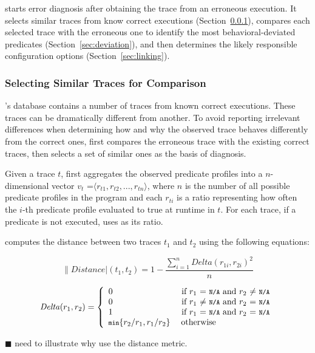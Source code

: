 \ourtool starts error diagnosis after obtaining the trace from
an erroneous execution. It selects similar
traces from know correct executions (Section~\ref{sec:similar}), compares
each selected trace with
the erroneous one to identify the most behavioral-deviated predicates
(Section~\ref{sec:deviation}), and then determines
the likely responsible configuration options (Section~\ref{sec:linking}).


\subsubsection{Selecting Similar Traces for Comparison}
\label{sec:similar}

\ourtool's database contains a number of
traces from known correct executions.  These traces
can be dramatically different from another.  To avoid reporting irrelevant
differences when 
determining how and why the observed trace behaves
differently from the correct ones, \ourtool first
compares the erroneous trace with the existing
correct traces, then selects a set of similar ones
as the basis of diagnosis.

Given a trace $t$, \ourtool first aggregates
the observed predicate profiles into a $n$-dimensional
vector $v_{t}$ =$\langle r_{t1}, r_{t2}, ..., r_{tn}\rangle$, where $n$
is the number of all possible predicate profiles in the program
and each $r_{ti}$ is a ratio representing how often the $i$-th predicate
profile evaluated
to true at runtime in $t$. For each trace, if a predicate is not executed,
\ourtool uses  as its ratio.


\ourtool computes the distance between two traces $t_1$ and $t_2$ using
the following equations:

\[
\|Distance|(t_1, t_2) = 1 - \frac{\sum_{i = 1}^{n}Delta(r_{1i}, r_{2i})^2}{n}
\]

\[
\|Delta|(r_1, r_2) = 
\left\{
\begin{array}{l l l l}
  0 & \ \mbox{if $r_1$ = \CodeIn{N/A} and $r_2$ $\neq$ \CodeIn{N/A}}\\
  0 & \ \mbox{if $r_1$ $\neq$ \CodeIn{N/A} and $r_2$ = \CodeIn{N/A}}\\
  1 & \ \mbox{if $r_1$ = \CodeIn{N/A} and $r_2$ = \CodeIn{N/A}}\\
  \CodeIn{min}\{r_2/r_1, r_1/r_2\} & \; \mbox{otherwise}\\ \end{array} \right.
\]


$\blacksquare$ need to illustrate why use the distance metric.

